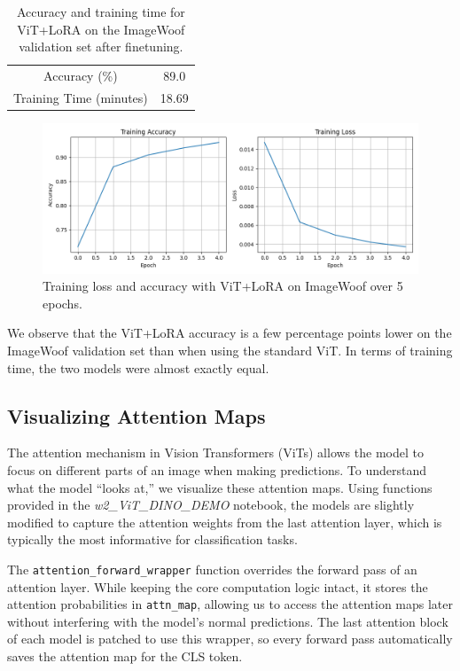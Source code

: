 \documentclass[10pt]{article}
\begin{document}
\begin{table}[ht]
    \centering
    \begin{tabular}{c|c}
        Accuracy (\%) &  89.0 \\
        Training Time (minutes) & 18.69
    \end{tabular}
    \caption{Accuracy and training time for ViT+LoRA on the ImageWoof validation set after finetuning.}
    \label{tab:placeholder}
\end{table}

\begin{figure}[ht]
    \centering
    \includegraphics[width=1\linewidth]{images/training_loss_curve_LoRA.png}
    \caption{Training loss and accuracy with ViT+LoRA on ImageWoof over 5 epochs.}
    \label{fig:placeholder}
\end{figure}

We observe that the ViT+LoRA accuracy is a few percentage points lower on the ImageWoof validation set than when using the standard ViT. In terms of training time, the two models were almost exactly equal.

\subsection{Visualizing Attention Maps}

The attention mechanism in Vision Transformers (ViTs) allows the model to focus on different parts of an image when making predictions. To understand what the model ``looks at,'' we visualize these attention maps. Using functions provided in the \textit{w2\_ViT\_DINO\_DEMO} notebook, the models are slightly modified to capture the attention weights from the last attention layer, which is typically the most informative for classification tasks.

The \texttt{attention\_forward\_wrapper} function overrides the forward pass of an attention layer. While keeping the core computation logic intact, it stores the attention probabilities in \texttt{attn\_map}, allowing us to access the attention maps later without interfering with the model's normal predictions. The last attention block of each model is patched to use this wrapper, so every forward pass automatically saves the attention map for the CLS token.
\end{document}
